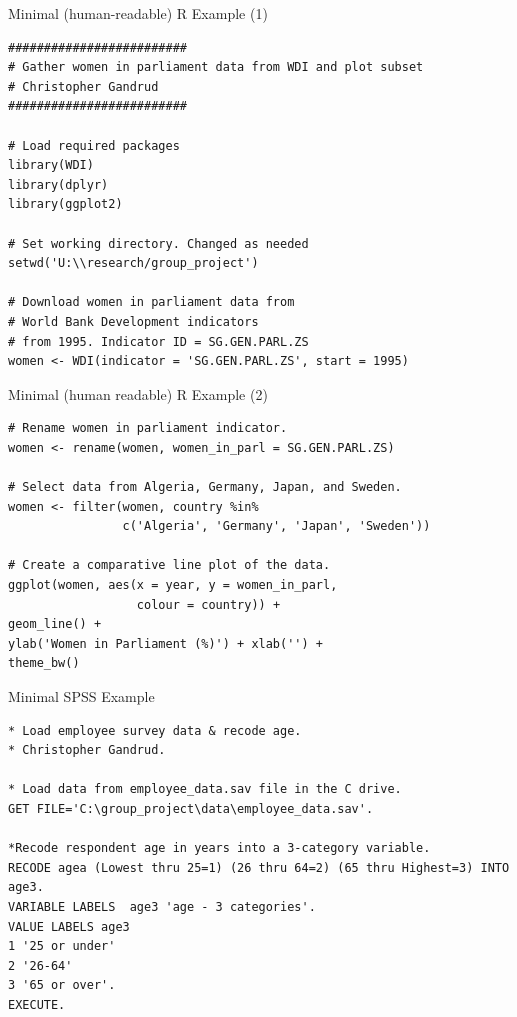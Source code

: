 \documentclass[10pt]{beamer}
\begin{document}
\begin{frame}[fragile]{Minimal (human-readable) R Example (1)}

\begin{lstlisting}
#########################
# Gather women in parliament data from WDI and plot subset
# Christopher Gandrud
#########################

# Load required packages
library(WDI)
library(dplyr)
library(ggplot2)

# Set working directory. Changed as needed
setwd('U:\\research/group_project')

# Download women in parliament data from
# World Bank Development indicators
# from 1995. Indicator ID = SG.GEN.PARL.ZS
women <- WDI(indicator = 'SG.GEN.PARL.ZS', start = 1995)
\end{lstlisting}

\end{frame}

\begin{frame}[fragile]{Minimal (human readable) R Example (2)}

\begin{lstlisting}
# Rename women in parliament indicator.
women <- rename(women, women_in_parl = SG.GEN.PARL.ZS)

# Select data from Algeria, Germany, Japan, and Sweden.
women <- filter(women, country %in%
                c('Algeria', 'Germany', 'Japan', 'Sweden'))

# Create a comparative line plot of the data.
ggplot(women, aes(x = year, y = women_in_parl,
                  colour = country)) +
geom_line() +
ylab('Women in Parliament (%)') + xlab('') +
theme_bw()
\end{lstlisting}

\end{frame}


\begin{frame}[fragile]{Minimal SPSS Example}

\begin{lstlisting}
* Load employee survey data & recode age.
* Christopher Gandrud.

* Load data from employee_data.sav file in the C drive.
GET FILE='C:\group_project\data\employee_data.sav'.

*Recode respondent age in years into a 3-category variable.
RECODE agea (Lowest thru 25=1) (26 thru 64=2) (65 thru Highest=3) INTO age3.
VARIABLE LABELS  age3 'age - 3 categories'.
VALUE LABELS age3
1 '25 or under'
2 '26-64'
3 '65 or over'.
EXECUTE.
\end{lstlisting}

\end{frame}
\end{document}
